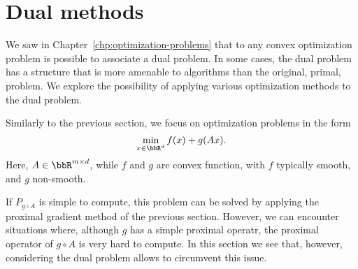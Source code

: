  
 
 
     \section{Dual methods}
 
     We saw in Chapter~\ref{chp:optimization-problems} that to any convex optimization problem is possible to associate a dual problem.
     In some cases, the dual problem has a structure that is more amenable to algorithms than the original, primal, problem. We explore the possibility of applying various optimization methods to the dual problem.
 
     Similarly to the previous section, we focus on optimization problems in the form
     \begin{equation}
         \label{eq:f+gA-dual}
         \min_{x\in\bbR^d} f(x) + g(Ax).
     \end{equation}
     Here,  $A\in \bbR^{m\times d}$, while $f$ and $g$ are convex function, with $f$ typically smooth, and $g$ non-smooth.
 
     If $P_{g\circ A}$ is simple to compute, this problem can be solved by applying the proximal gradient method of the previous section.
     However, we can encounter situations where, although $g$ has a simple proximal operatr, the proximal operator of ${g\circ A}$ is very hard to compute.
     In this section we see that, however, considering the dual problem allows to circumvent this issue.
 
